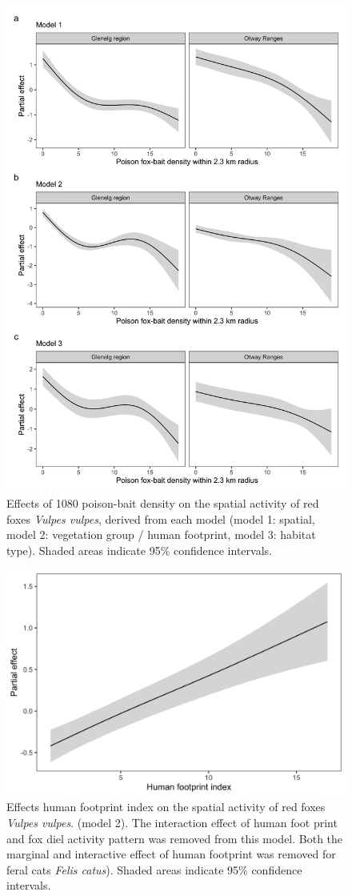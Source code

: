 \documentclass[preprint, 3p, authoryear]{elsarticle} %
\begin{document}
\begin{figure}

{\centering \includegraphics[width=0.8\linewidth]{../figs/foxbaiting_effects} 

}

\caption{Effects of 1080 poison-bait density on the spatial activity of red foxes \textit{Vulpes vulpes}, derived from each model (model 1: spatial, model 2: vegetation group / human footprint, model 3: habitat type). Shaded areas indicate 95\% confidence intervals.}\label{fig:fox-baits}
\end{figure}

\begin{figure}

{\centering \includegraphics[width=0.8\linewidth]{../figs/fox_hfi} 

}

\caption{Effects human footprint index on the spatial activity of red foxes \textit{Vulpes vulpes}. (model 2). The interaction effect of human foot print and fox diel activity pattern was removed from this model. Both the marginal and interactive effect of human footprint was removed for feral cats \textit{Felis catus}). Shaded areas indicate 95\% confidence intervals.}\label{fig:fox-hfi}
\end{figure}
\end{document}
